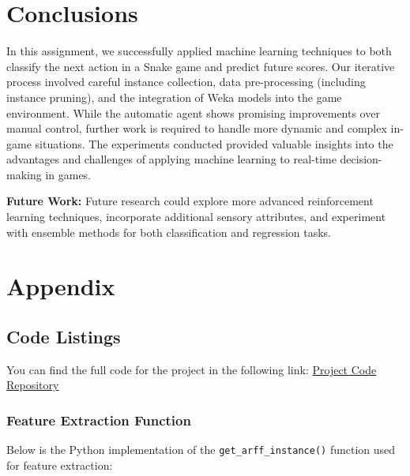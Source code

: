 \documentclass[12pt,a4paper]{article}
\begin{document}
\section{Conclusions}
In this assignment, we successfully applied machine learning techniques to both classify the next action in a Snake game and predict future scores. Our iterative process involved careful instance collection, data pre-processing (including instance pruning), and the integration of Weka models into the game environment. While the automatic agent shows promising improvements over manual control, further work is required to handle more dynamic and complex in-game situations. The experiments conducted provided valuable insights into the advantages and challenges of applying machine learning to real-time decision-making in games.

\vspace{1em}
\noindent\textbf{Future Work:} Future research could explore more advanced reinforcement learning techniques, incorporate additional sensory attributes, and experiment with ensemble methods for both classification and regression tasks.


\newpage
\section{Appendix}

\subsection{Code Listings}

You can find the full code for the project in the following link:
\href{https://github.com/carlos1302-ai/projec1_ml}{Project Code Repository}


\subsubsection{Feature Extraction Function}
\label{sec:feature-extraction}

Below is the Python implementation of the \texttt{get\_arff\_instance()} function used for feature extraction:
\end{document}
